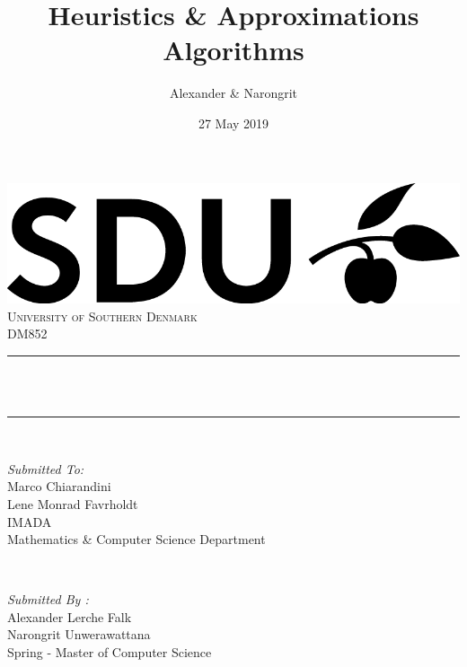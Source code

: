 \documentclass[12pt]{article}
\title{Heuristics \& Approximations Algorithms}								%
\author{Alexander \& Narongrit}								%
\date{27 May 2019}											%
\makeatletter
\let\thetitle\@title
\makeatother
\begin{document}

\begin{titlepage}
	\centering
    \vspace*{0.5 cm}
    \includegraphics[scale = 0.5]{SDU_logo.png}\\[1.0 cm]	%
    \textsc{\LARGE University of Southern Denmark}\\[2.0 cm]	%
	\textsc{\Large DM852}\\[0.5 cm]				%
	\rule{\linewidth}{0.2 mm} \\[0.4 cm]
	{ \huge \bfseries \thetitle}\\
	\rule{\linewidth}{0.2 mm} \\[1.5 cm]
	
	\begin{minipage}{0.4\textwidth}
		\begin{flushleft} \large
			\emph{Submitted To:}\\
			Marco Chiarandini\\
            Lene Monrad Favrholdt \\
			IMADA \\
			Mathematics \& Computer Science Department \\
			\end{flushleft}
			\end{minipage}~
			\begin{minipage}{0.4\textwidth}
            
			\begin{flushright} \large
			\emph{Submitted By :} \\
			Alexander Lerche Falk\\
            Narongrit Unwerawattana\\
            Spring - Master of Computer Science\\
		\end{flushright}
        
	\end{minipage}\\[2 cm]
	
	
    
    
    
    
	
\end{titlepage}
\end{document}
